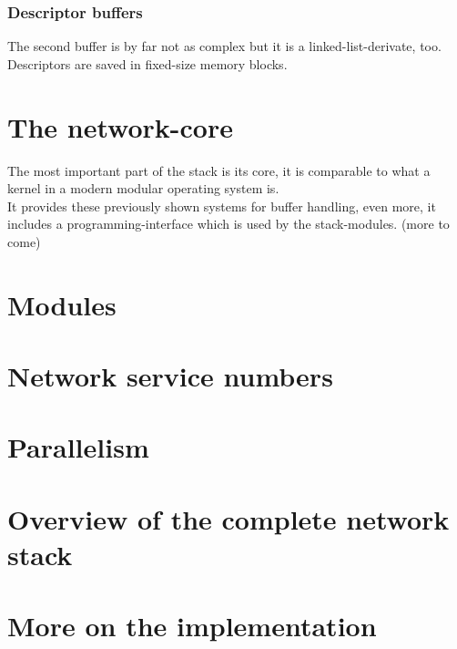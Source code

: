 \documentclass[11pt,a4paper]{article}
\begin{document}
\subsubsection{Descriptor buffers}
The second buffer is by far not as complex but it is a linked-list-derivate, too. Descriptors are saved in fixed-size memory blocks.


\section{The network-core}
The most important part of the stack is its core, it is comparable to what a kernel in a modern modular operating system is.
\\
It provides these previously shown systems for buffer handling, even more, it includes a programming-interface
which is used by the stack-modules.
(more to come)
\section{Modules}

\section{Network service numbers}
\section{Parallelism}
\section{Overview of the complete network stack}
\section{More on the implementation}
\end{document}
